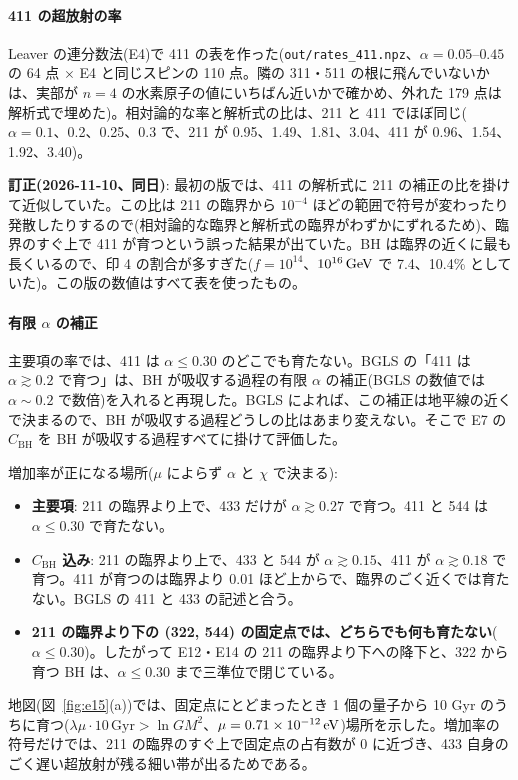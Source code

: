 \paragraph{411 の超放射の率}
Leaver の連分数法(E4)で 411 の表を作った(\texttt{out/rates\_411.npz}、$\alpha=0.05$--$0.45$ の 64 点 $\times$ E4 と同じスピンの 110 点。隣の 311・511 の根に飛んでいないかは、実部が $n=4$ の水素原子の値にいちばん近いかで確かめ、外れた 179 点は解析式で埋めた)。相対論的な率と解析式の比は、211 と 411 でほぼ同じ($\alpha=0.1$、0.2、0.25、0.3 で、211 が 0.95、1.49、1.81、3.04、411 が 0.96、1.54、1.92、3.40)。

\textbf{訂正(2026-11-10、同日)}: 最初の版では、411 の解析式に 211 の補正の比を掛けて近似していた。この比は 211 の臨界から $10^{-4}$ ほどの範囲で符号が変わったり発散したりするので(相対論的な臨界と解析式の臨界がわずかにずれるため)、臨界のすぐ上で 411 が育つという誤った結果が出ていた。BH は臨界の近くに最も長くいるので、印 4 の割合が多すぎた($f=10^{14}$、$10^{16}\,\mathrm{GeV}$ で 7.4、10.4\% としていた)。この版の数値はすべて表を使ったもの。

\paragraph{有限 $\alpha$ の補正}
主要項の率では、411 は $\alpha\le0.30$ のどこでも育たない。BGLS の「411 は $\alpha\gtrsim0.2$ で育つ」は、BH が吸収する過程の有限 $\alpha$ の補正(BGLS の数値では $\alpha\sim0.2$ で数倍)を入れると再現した。BGLS によれば、この補正は地平線の近くで決まるので、BH が吸収する過程どうしの比はあまり変えない。そこで E7 の $C_\mathrm{BH}$ を BH が吸収する過程すべてに掛けて評価した。

\begin{result}
増加率が正になる場所($\mu$ によらず $\alpha$ と $\chi$ で決まる):
\begin{itemize}
\item \textbf{主要項}: 211 の臨界より上で、433 だけが $\alpha\gtrsim0.27$ で育つ。411 と 544 は $\alpha\le0.30$ で育たない。
\item \textbf{$C_\mathrm{BH}$ 込み}: 211 の臨界より上で、433 と 544 が $\alpha\gtrsim0.15$、411 が $\alpha\gtrsim0.18$ で育つ。411 が育つのは臨界より 0.01 ほど上からで、臨界のごく近くでは育たない。BGLS の 411 と 433 の記述と合う。
\item \textbf{211 の臨界より下の (322, 544) の固定点では、どちらでも何も育たない}($\alpha\le0.30$)。したがって E12・E14 の 211 の臨界より下への降下と、322 から育つ BH は、$\alpha\le0.30$ まで三準位で閉じている。
\end{itemize}
地図(図~\ref{fig:e15}(a))では、固定点にとどまったとき 1 個の量子から 10 Gyr のうちに育つ($\lambda\mu\cdot10\,\mathrm{Gyr}>\ln GM^2$、$\mu=0.71\times10^{-12}\,\mathrm{eV}$)場所を示した。増加率の符号だけでは、211 の臨界のすぐ上で固定点の占有数が 0 に近づき、433 自身のごく遅い超放射が残る細い帯が出るためである。
\end{result}


